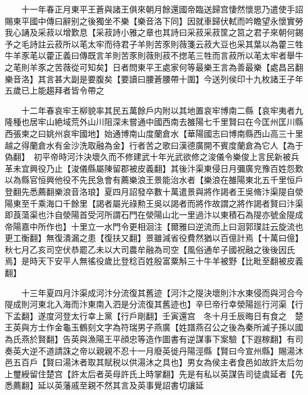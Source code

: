 　　十一年春正月東平王蒼與諸王俱來朝月餘還國帝臨送歸宫悽然懷思乃遣使手詔賜東平國中傳曰辭别之後獨坐不樂【樂音洛下同】因就車歸伏軾而吟瞻望永懷實勞我心誦及采菽以增歎息【采菽詩小雅之章也其詩曰采菽采菽筐之筥之君子來朝何錫予之毛詩註云菽所以芼太牢而待君子羊則苦豕則薇箋云菽大豆也采其葉以為藿三牲牛羊豕芼以藿正義曰傳既言羊則苦豕則薇則菽不揔芼三牲而言菽所以芼太牢者舉牛之芼則羊豕之苦薇從可知矣】日者問東平王處家何等最樂王言為善最樂【處昌呂翻樂音洛】其言甚大副是要腹矣【要讀曰腰蒼腰帶十圍】今送列侯印十九枚諸王子年五歲已上能趨拜者皆令帶之

　　十二年春哀牢王柳貌率其民五萬餘戶内附以其地置哀牢博南二縣【哀牢夷者九隆種也居牢山絶域荒外山川阻深未嘗通中國西南去雒陽七千里賢曰在今匡州匡川縣西張柬之曰姚州哀牢國地】始通博南山度蘭倉水【華陽國志曰博南縣西山高三十里越之得蘭倉水有金沙洗取融為金】行者苦之歌曰漢德廣開不賓度蘭倉為它人【為于偽翻】　初平帝時河汴決壞久而不修建武十年光武欲修之浚儀令樂俊上言民新被兵革未宜興役乃止【浚儀縣屬陳留郡被皮義翻】其後汴渠東侵日月彌廣兖豫百姓怨歎以為縣官恒興他役不先民急會有薦樂浪王景能治水者【樂浪在雒陽東北五千里恒戶登翻先悉薦翻樂浪音洛琅】夏四月詔發卒數十萬遣景與將作謁者王吳脩汴渠隄自滎陽東至千乘海口千餘里【謁者屬光祿勲王吳以謁者而將作故謂之將作謁者賢曰汴渠即莨蕩渠也汴自滎陽首受河所謂石門在滎陽山北一里過汴以東積石為隄亦號金隄成帝陽嘉中所作也】十里立一水門令更相洄注【爾雅曰逆流而上曰洄郭璞註云旋流也更工衡翻】無復潰漏之患【復扶又翻】景雖減省役費然猶以百億計焉【十萬曰億】　秋七月乙亥司空伏恭罷乙未以大司農牟融為司空【風俗通牟子國祝融之後後因氏焉】是時天下安平人無徭役歲比登稔百姓殷富粟斛三十牛羊被野【比毗至翻被皮義翻】

　　十三年夏四月汴渠成河汴分流復其舊迹【河汴之隄決壞則汴水東侵而與河合今隄成則河東北入海而汴東南入泗是分流復其舊迹也】辛巳帝行幸滎陽廵行河渠【行下孟翻】遂度河登太行幸上黨【行戶剛翻】壬寅還宫　冬十月壬辰晦日有食之　楚王英與方士作金龜玉鶴刻文字為符瑞男子燕廣【姓譜燕召公之後為秦所滅子孫以國為氏燕於賢翻】告英與漁陽王平顔忠等造作圖書有逆謀事下案驗【下遐稼翻】有司奏英大逆不道請誅之帝以親親不忍十一月廢英徙丹陽涇縣【賢曰今宣州縣】賜湯沐邑五百戶【賢曰湯沐者取其賦税以供湯沐之具也】男女為侯主者食邑如故許太后勿上璽綬留住楚宫【許太后者英母許氏上時掌翻】先是有私以英謀告司徒虞延者【先悉薦翻】延以英藩戚至親不然其言及英事覺詔書切讓延

